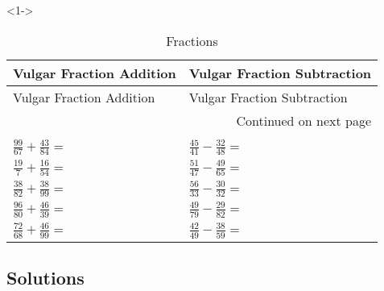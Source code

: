 \documentclass[ngerman,xcolor={table,dvipsnames},smaller,compress,hyperref={bookmarks,colorlinks}]{beamer}
\begin{document}
\begin{frame}[t,fragile]

\begin{block}<1->{}

\footnotesize
\begin{longtable}[l]{p{5.5cm}|p{5.5cm}}
\toprule
Vulgar Fraction Addition & Vulgar Fraction Subtraction \\
\midrule
\endfirsthead

\toprule
Vulgar Fraction Addition & Vulgar Fraction Subtraction \\
\midrule
\endhead
\midrule
\multicolumn{2}{r}{{Continued on next page}} \\
\bottomrule
\endfoot

\caption{Fractions\label{vulgar_fractions_addition}}\\
\endlastfoot
$ \frac{99}{67} + \frac{43}{84} = $ & $ \frac{45}{41} - \frac{32}{48} = $ \\
$ \frac{19}{7} + \frac{16}{54} = $  & $ \frac{51}{47} - \frac{49}{65} = $ \\
$ \frac{38}{82} + \frac{38}{99} = $ & $ \frac{56}{33} - \frac{30}{32} = $ \\
$ \frac{96}{80} + \frac{46}{39} = $ & $ \frac{49}{79} - \frac{29}{82} = $ \\
$ \frac{72}{68} + \frac{46}{99} = $ & $ \frac{42}{49} - \frac{38}{59} = $ \\
\bottomrule
\end{longtable}

\end{block}

\end{frame}

\subsection{Solutions}
\end{document}
